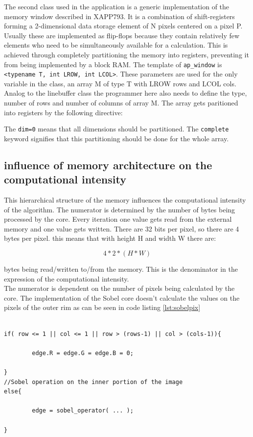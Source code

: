The second class used in the application is a generic implementation of the memory window described in XAPP793. It is a combination of shift-registers forming a 2-dimensional data storage element of N pixels centered on a pixel P. Usually these are implemented as flip-flops because they contain relatively few elements who need to be simultaneously available for a calculation. This is achieved through completely partitioning the memory into registers, preventing it from being implemented by a block RAM.
The template of \texttt{ap\_window} is \texttt{<typename T, int LROW, int LCOL>}. These parameters are used for the only variable in the class, an array M of type T with LROW rows and LCOL cols. Analog to the linebuffer class the programmer here also needs to define the type, number of rows and number of columns of array M. The array gets paritioned into registers by the following directive:




The \texttt{dim=0} means that all dimensions should be partitioned. The \texttt{complete} keyword signifies that this partitioning should be done for the whole array.


\subsection{influence of memory architecture on the computational intensity}

This hierarchical structure of the memory influences the computational intensity of the algorithm. The numerator is determined by the number of bytes being processed by the core. Every iteration one value gets read from the external memory and one value gets written.  There are 32 bits per pixel, so there are 4 bytes per pixel. this means that with height H and width W there are:

\begin{equation} \label{eq:orig_den}
4 * 2 * ( H * W )
\end{equation}

bytes being read/written to/from the memory. This is the denominator in the expression of the computational intensity.\\
The numerator is dependent on the number of pixels being calculated by the core. The implementation of the Sobel core doesn't calculate the values on the pixels of the outer rim as can be seen in code listing \ref{lst:sobelpix}

\begin{lstlisting}[caption=Sobel Code Snippet, captionpos=b, label=lst:sobelpix]

if( row <= 1 || col <= 1 || row > (rows-1) || col > (cols-1)){
		
		edge.R = edge.G = edge.B = 0;
		
}
//Sobel operation on the inner portion of the image
else{

		edge = sobel_operator( ... );
		
}

\end{lstlisting}

